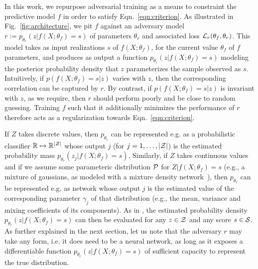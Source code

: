 \documentclass[twocolumn,superscriptaddress,aps]{revtex4-1}
\theoremstyle{plain}
\begin{document}
In this work, we repurpose adversarial training as a means to constraint the
predictive model $f$ in order to satisfy Eqn.~\ref{eqn:criterion}. As
illustrated in Fig.~\ref{fig:architecture}, we pit $f$ against an adversary
model $r := p_{\theta_r}(z | f(X;\theta_f)=s)$ of parameters $\theta_r$ and
associated loss ${\cal L}_r(\theta_f, \theta_r)$. This model takes  as input
realizations $s$ of $f(X; \theta_f)$, for the current value $\theta_f$ of $f$
parameters, and produces as output a function $p_{\theta_r}(z | f(X;\theta_f)=s)$
modeling the posterior probability density that $z$ parameterizes the sample
observed as $s$.
Intuitively, if $p(f(X; \theta_f)=s|z)$ varies with $z$,
then the corresponding correlation can be captured by $r$. By contrast, if
$p(f(X; \theta_f)=s|z)$ is invariant with $z$, as we require, then $r$ should
perform poorly and be close to random guessing. Training $f$ such that it
additionally minimizes the performance of $r$ therefore acts as a regularization
towards Eqn.~\ref{eqn:criterion}.

If $Z$ takes discrete values, then $p_{\theta_r}$ can be represented e.g. as a
probabilistic classifier $\mathbb{R} \mapsto \mathbb{R}^{|{\cal Z|}}$ whose
output $j$ (for $j=1, \dots, |{\cal Z}|$) is the estimated probability mass
$p_{\theta_r}(z_j|f(X;\theta_f)=s)$. Similarly, if $Z$ takes continuous values and
if we assume some parameteric distribution ${\cal P}$ for $Z|f(X;\theta_f)=s$
(e.g., a mixture of gaussians, as modeled with a mixture
density network~\citep{bishop1994mixture}), then $p_{\theta_r}$ can be
represented e.g. as network whose output $j$ is the estimated value of the
corresponding parameter $\gamma_j$ of that distribution (e.g., the mean,
variance and mixing coefficients of its components). As in
\citep{nix1994estimating,bishop1994mixture}, the estimated probability density
$p_{\theta_r}(z|f(X;\theta_f)=s)$ can then be evaluated for any $z \in {\cal Z}$ and any score $s \in {\cal S}$.
As further explained in the next section, let us note that the adversary $r$ may
take any form, i.e. it does need to be a neural network, as long as it exposes a
differentiable function $p_{\theta_r}(z|f(X;\theta_f)=s)$ of sufficient capacity
to represent the true distribution.
\end{document}
